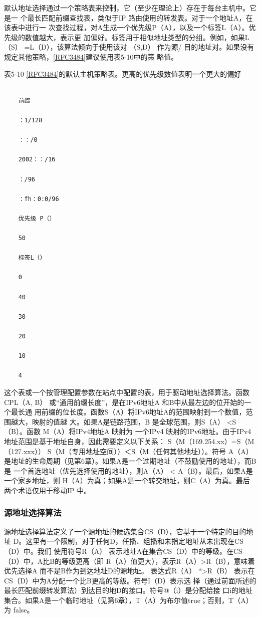 默认地址选择通过一个策略表来控制，它（至少在理论上）存在于每台主机中。它是一
个最长匹配前缀查找表，类似于IP 路由使用的转发表。对于一个地址A，在该表中进行一
次查找过程，对A生成一个优先级P（A），以及一个标签L（A）。优先级的数值越大，表示更
加偏好。标签用于相似地址类型的分组。例如，如果L（S） =L（D），该算法倾向于使用该对
（S,D） 作为源/
目的地址对。如果没有规定其他策略，\href{https://www.rfc-editor.org/rfc/rfc3484}{[RFC3484]}建议使用表5-10中的策
略值。

表5-10
\href{https://www.rfc-editor.org/rfc/rfc3484}{[RFC3484]}的默认主机策略表。更高的优先级数值表明一个更大的偏好
\begin{verbatim}

    前缀

    ：1/128

    ：：/0

    2002：：/16

    ：/96

    ：fh：0:0/96

    优先级 P（）

    50

    标签L（）

    0

    40

    30

    20

    10

    4
\end{verbatim}

这个表或一个按管理配置参数在站点中配置的表，用于驱动地址选择算法。函数
CPL（A, B） 或“通用前缀长度”，是在IPv6地址A 和B中从最左边的位开始的一个最长通
用前缀的位长度。函数S（A）将IPv6地址A的范围映射到一个数值，范围越大，映射的值越
大。如果A是链路范围，B 是全球范围，则S（A） <S（B）。函数 M（A）将IPv4地址A 映射为
一个IPv4 映射的IPv6地址。由于IPv4地址范围是基于地址自身，因此需要定义以下关系：
S（M（169.254.xx）=S（M（127.xxx）） S（M（专用地址空间））＜S（M（任何其他地址））。符号
A（A）是地址的生命周期（见第6章）。如果A是一个过期地址（不鼓励使用的地址），而B是
一个首选地址（优先选择使用的地址），则A（A） < A（B）。最后，如果A是一个家乡地址，则
H（A）为真；如果A是一个转交地址，则C（A）为真。最后两个术语仅用于移动IP 中。

\subsubsection{源地址选择算法}
源地址选择算法定义了一个源地址的候选集合CS（D），它基于一个特定的目的地址
D。这里有一个限制，对于任何D，任播、组播和未指定地址从未出现在CS（D）中。我们
使用符号R（A） 表示地址A在集合CS（D）中的等级。在CS（D）中，A比B的等级更高（即
R（A）值更大），表示R（A）>R（B），意味着优先选择A 而不是B作为到达地址D的源地址。
表达式R（A） *>R（B） 表示在CS（D）中为A分配一个比B更高的等级。符号I（D）表示选
择（通过前面所述的最长匹配前缀转发算法）到达目的地D的接口。符号@（i）是分配给接
口i的地址集合。如果A是一个临时地址（见第6章），T（A）为布尔值true；否则，T（A）为
false。

